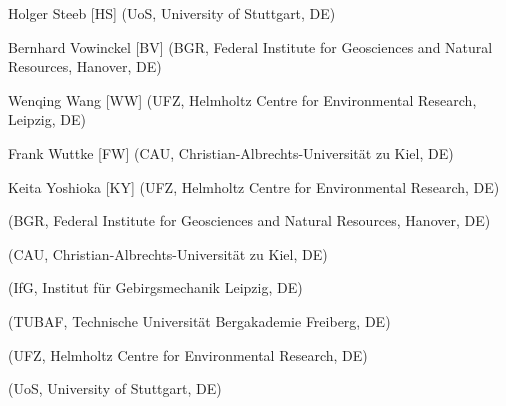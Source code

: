 \begin{list}{-}{\leftmargin=1em \itemindent=0em \itemsep=0.1em}
\item Holger Steeb [HS] (UoS, University of Stuttgart, DE)	

\item Bernhard Vowinckel [BV] (BGR, Federal Institute for Geosciences and Natural Resources, Hanover, DE)	

\item Wenqing Wang [WW] (UFZ, Helmholtz Centre for Environmental Research, Leipzig, DE) 

\item Frank Wuttke [FW] (CAU, Christian-Albrechts-Universität zu Kiel, DE)	

\item Keita Yoshioka [KY] (UFZ, Helmholtz Centre for Environmental Research, DE) 

\item [] (BGR, Federal Institute for Geosciences and Natural Resources, Hanover, DE)	
\item [] (CAU, Christian-Albrechts-Universität zu Kiel, DE)	
\item [] (IfG, Institut für Gebirgsmechanik Leipzig, DE)	
\item [] (TUBAF, Technische Universität Bergakademie Freiberg, DE)	
\item [] (UFZ, Helmholtz Centre for Environmental Research, DE)	
\item [] (UoS, University of Stuttgart, DE)	

\end{list}
